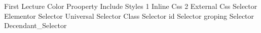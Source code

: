First Lecture
  Color Prooperty
  Include Styles
    1 Inline Css
    2 External Css
  Selector
  Elementor Selector 
  Universal Selector
  Class Selector
  id Selector
  groping Selector
  Decendant_Selector

  
